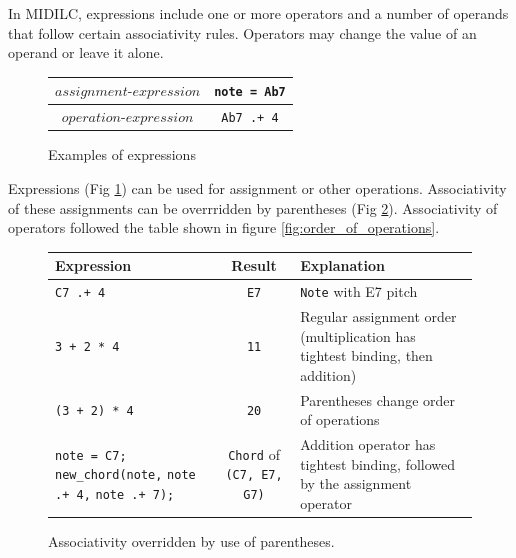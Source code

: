 \documentclass[12pt,A4]{book}
\begin{document}
In MIDILC, expressions include one or more operators and a number of operands that follow certain associativity rules. Operators may change the value of an operand or leave it alone. 

\begin{figure}
\center
\begin{tabular}{|c|c|}
\hline
$assignment\mbox{-}expression$  & \verb|note = Ab7| \\ \hline
$operation\mbox{-}expression$   & \verb|Ab7 .+ 4| \\ \hline
\end{tabular}
\label{fig:expressions}
\caption{Examples of expressions}
\end{figure}

Expressions (Fig \ref{fig:expressions}) can be used for assignment or other operations. Associativity of these assignments can be overrridden by parentheses (Fig \ref{fig:associativity}). Associativity of operators followed the table shown in figure \ref{fig:order_of_operations}.

\begin{figure}
\center
\begin{tabular}{|p{}|c|p{}|}
\hline
Expression & Result & Explanation \\ \hline
\verb|C7 .+ 4| & \verb|E7| & \verb|Note| with E7 pitch \\ \hline
\verb|3 + 2 * 4| & \verb|11| &	Regular assignment order (multiplication has tightest binding, then addition) \\ \hline
\verb|(3 + 2) * 4| &\verb|20| & Parentheses change order of operations \\ \hline
\verb|note = C7;| \verb|new_chord(note,| \verb|note .+ 4,| \verb|note .+ 7);| & \verb|Chord| of \verb|(C7, E7, G7)| & Addition operator has tightest binding, followed by the assignment operator \\ \hline
\end{tabular}
\label{fig:associativity}
\caption{Associativity overridden by use of parentheses.}
\end{figure}
\end{document}
